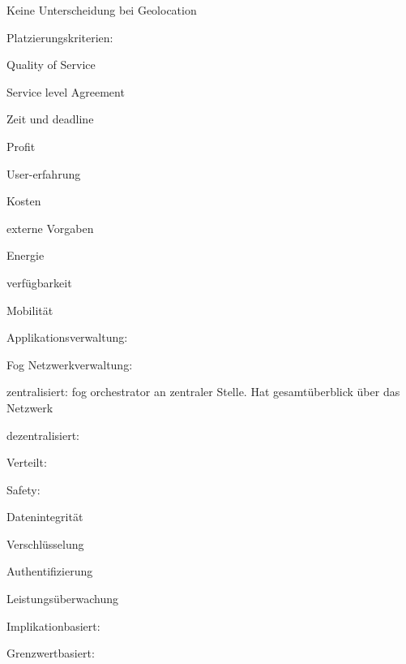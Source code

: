 \begin{notes}
\begin{notes}
\begin{notes}
\begin{notes}
                \item   Keine Unterscheidung bei Geolocation
            \end{notes}
            \item Platzierungskriterien:
            \begin{notes}
                \item Quality of Service
                \item Service level Agreement
                \item Zeit und deadline
                \item Profit
                \item User-erfahrung
                \item Kosten
                \item externe Vorgaben
                \item Energie
                \item verfügbarkeit
                \item Mobilität
            \end{notes}
        \end{notes}
        \item Applikationsverwaltung: \cite{Mahmud2020}
        \begin{notes}
            \item Fog Netzwerkverwaltung: \cite{Costa2022}
            \begin{notes}
                \item zentralisiert: fog orchestrator an zentraler Stelle. Hat gesamtüberblick über das Netzwerk
                \item dezentralisiert: 
                \item Verteilt:
            \end{notes}
            \item Safety:
            \begin{notes}
                \item Datenintegrität
                \item Verschlüsselung
                \item Authentifizierung
            \end{notes}
            \item Leistungsüberwachung
            \begin{notes}
                \item Implikationbasiert: 
                \item Grenzwertbasiert:

\end{notes}
\end{notes}
\end{notes}
\end{notes}
